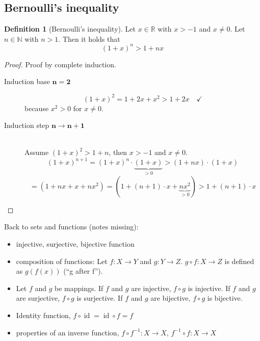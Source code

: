 \documentclass[a4paper,landscape,twocolumn]{article}
\theoremstyle{definition}
\newtheorem{defi}{Definition}
\begin{document}
\subsection{Bernoulli's inequality}
%
\begin{defi}[Bernoulli's inequality]
  Let $x \in \mathbb R$ with $x > -1$ and $x \neq 0$.
  Let $n \in \mathbb N$ with $n > 1$. Then it holds that
  \[ (1 + x)^n > 1 + nx \]
\end{defi}
\begin{proof}
  Proof by complete induction.
  \begin{description}
    \item[Induction base $\mathbf{n = 2}$]
      \[ (1 + x)^2 = 1 + 2x + x^2 > 1 + 2x \quad\checkmark \]
      because $x^2 > 0$ for $x \neq 0$.
    \item[Induction step $\mathbf{n \rightarrow n+1}$] \hfill{} \\
      Assume $(1+x)^2 > 1 + n$, then $x > -1$ and $x \neq 0$.
      \[ (1 + x)^{n+1} = (1 + x)^n \cdot \underbrace{(1 + x)}_{>0} > (1+nx) \cdot (1 + x) \]
      \[ = (1 + nx + x + nx^2) = (1 + (n+1)\cdot x + \underbrace{nx^2}_{>0}) > 1 + (n + 1) \cdot x \]
  \end{description}
\end{proof}

Back to sets and functions (notes missing):
\begin{itemize}
  \item injective, surjective, bijective function
  \item composition of functions: Let $f: X \rightarrow Y$ and $g: Y \rightarrow Z$. $g \circ f: X \rightarrow Z$ is defined as $g(f(x))$ (\enquote{g after f}).
  \item Let $f$ and $g$ be mappings. If $f$ and $g$ are injective, $f \circ g$ is injective. If $f$ and $g$ are surjective, $f \circ g$ is surjective. If $f$ and $g$ are bijective, $f \circ g$ is bijective.
  \item Identity function, $f \circ \operatorname{id} = \operatorname{id} \circ f = f$
  \item properties of an inverse function, $f \circ f^{-1}: X \rightarrow X$, $f^{-1} \circ f: X \rightarrow X$
\end{itemize}
\end{document}
